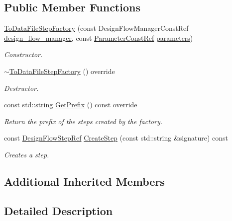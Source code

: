 \subsection*{Public Member Functions}
\begin{DoxyCompactItemize}
\item 
\hyperlink{classToDataFileStepFactory_a04cc9c9f141172cb09ad8d0f39040794}{To\+Data\+File\+Step\+Factory} (const Design\+Flow\+Manager\+Const\+Ref \hyperlink{classDesignFlowStepFactory_ae7854875d87ed8d2fb4d82b2fa017b79}{design\+\_\+flow\+\_\+manager}, const \hyperlink{Parameter_8hpp_a37841774a6fcb479b597fdf8955eb4ea}{Parameter\+Const\+Ref} \hyperlink{classDesignFlowStepFactory_ab2c8bba23db9f4066e1a27ee7157c2de}{parameters})
\begin{DoxyCompactList}\small\item\em Constructor. \end{DoxyCompactList}\item 
\hyperlink{classToDataFileStepFactory_a03b7ad5b6db79448ab7c7fd4b236b9c9}{$\sim$\+To\+Data\+File\+Step\+Factory} () override
\begin{DoxyCompactList}\small\item\em Destructor. \end{DoxyCompactList}\item 
const std\+::string \hyperlink{classToDataFileStepFactory_abf32d2fdf2cbc501b3d1951f0fb55e93}{Get\+Prefix} () const override
\begin{DoxyCompactList}\small\item\em Return the prefix of the steps created by the factory. \end{DoxyCompactList}\item 
const \hyperlink{design__flow__step_8hpp_a9dd6b4474ddf52d41a78b1aaa12ae6c8}{Design\+Flow\+Step\+Ref} \hyperlink{classToDataFileStepFactory_a851d4679d80e2a754f3adacaa91d9def}{Create\+Step} (const std\+::string \&signature) const
\begin{DoxyCompactList}\small\item\em Creates a step. \end{DoxyCompactList}\end{DoxyCompactItemize}
\subsection*{Additional Inherited Members}


\subsection{Detailed Description}


